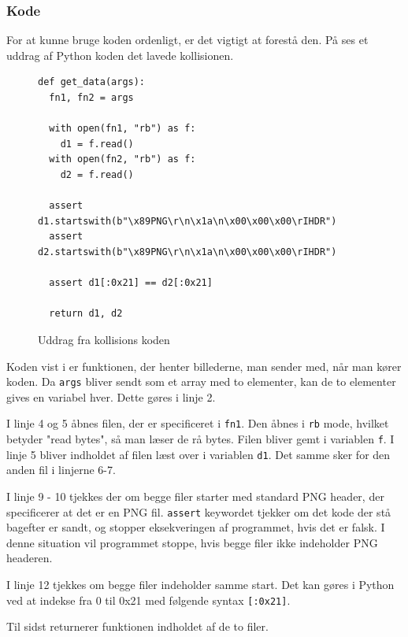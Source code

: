 \documentclass[12pt]{article}
\begin{document}
\subsubsection{Kode}
For at kunne bruge koden ordenligt, er det vigtigt at forestå den. På \figureautorefname{~\ref{code:coll-code}} ses et uddrag af Python koden det lavede kollisionen. 

\begin{figure}[ht]
\begin{verbatim}
def get_data(args):
  fn1, fn2 = args

  with open(fn1, "rb") as f:
    d1 = f.read()
  with open(fn2, "rb") as f:
    d2 = f.read()

  assert d1.startswith(b"\x89PNG\r\n\x1a\n\x00\x00\x00\rIHDR")
  assert d2.startswith(b"\x89PNG\r\n\x1a\n\x00\x00\x00\rIHDR")

  assert d1[:0x21] == d2[:0x21]

  return d1, d2
\end{verbatim}
\caption{Uddrag fra kollisions koden \cite{noauthor_hash_2022-1}}
\label{code:coll-code}
\end{figure}

Koden vist i \figureautorefname{~\ref{code:coll-code}} er funktionen, der henter billederne, man sender med, når man kører koden. Da \verb|args| bliver sendt som et array med to elementer, kan de to elementer gives en variabel hver. Dette gøres i linje 2. 

I linje 4 og 5 åbnes filen, der er specificeret i \verb|fn1|. Den åbnes i \verb|rb| mode, hvilket betyder "read bytes", så man læser de rå bytes. Filen bliver gemt i variablen \verb|f|. I linje 5 bliver indholdet af filen læst over i variablen \verb|d1|. 
Det samme sker for den anden fil i linjerne 6-7.

I linje 9 - 10 tjekkes der om begge filer starter med standard PNG header, der specificerer at det er en PNG fil. \verb|assert| keywordet tjekker om det kode der stå bagefter er sandt, og stopper eksekveringen af programmet, hvis det er falsk. I denne situation vil programmet stoppe, hvis begge filer ikke indeholder PNG headeren. 

I linje 12 tjekkes om begge filer indeholder samme start. Det kan gøres i Python ved at indekse fra 0 til 0x21 med følgende syntax \verb|[:0x21]|. 

Til sidst returnerer funktionen indholdet af de to filer. 
\end{document}
